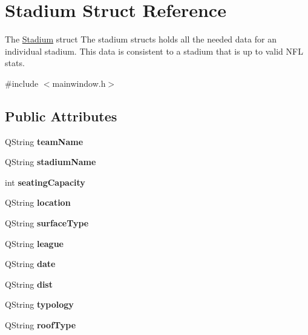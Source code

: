 \hypertarget{struct_stadium}{}\section{Stadium Struct Reference}
\label{struct_stadium}


The \mbox{\hyperlink{struct_stadium}{Stadium}} struct The stadium structs holds all the needed data for an individual stadium. This data is consistent to a stadium that is up to valid N\+FL stats.  




{\ttfamily \#include $<$mainwindow.\+h$>$}

\subsection*{Public Attributes}
\begin{DoxyCompactItemize}
\item 
\mbox{\label{struct_stadium_a670bca1f096388175dc6997573a408da}} 
Q\+String {\bfseries team\+Name}
\item 
\mbox{\label{struct_stadium_a3b2c399a2f9ab723f6e600f1ed5cdf95}} 
Q\+String {\bfseries stadium\+Name}
\item 
\mbox{\label{struct_stadium_a380740d66c210443a0e8835d42f99485}} 
int {\bfseries seating\+Capacity}
\item 
\mbox{\label{struct_stadium_aec9d2aca43177ea944695ac9e11a0a7c}} 
Q\+String {\bfseries location}
\item 
\mbox{\label{struct_stadium_a2f90421608990609256768dccd6f28df}} 
Q\+String {\bfseries surface\+Type}
\item 
\mbox{\label{struct_stadium_a52baa16d02b280841e89770597dbd2c8}} 
Q\+String {\bfseries league}
\item 
\mbox{\label{struct_stadium_a731a69e11ae8cc268e83b4a3c4714076}} 
Q\+String {\bfseries date}
\item 
\mbox{\label{struct_stadium_a733d73a3b70ea7596ed00686fda6bab3}} 
Q\+String {\bfseries dist}
\item 
\mbox{\label{struct_stadium_ae8c94fecbcf2b39b6336fac50d4cff2e}} 
Q\+String {\bfseries typology}
\item 
\mbox{\label{struct_stadium_ade10df5c0d01cd0987453c60f27a2c0a}} 
Q\+String {\bfseries roof\+Type}
\end{DoxyCompactItemize}


